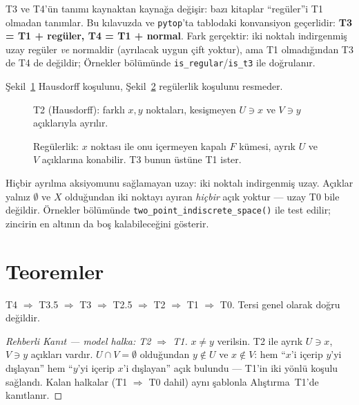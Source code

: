 \begin{dikkat}
T3 ve T4'ün tanımı kaynaktan kaynağa değişir: bazı kitaplar
``regüler''i T1 olmadan tanımlar. Bu kılavuzda ve \texttt{pytop}'ta
tablodaki konvansiyon geçerlidir: \textbf{T3 = T1 + regüler,
T4 = T1 + normal}. Fark gerçektir: iki noktalı indirgenmiş uzay
regüler \emph{ve} normaldir (ayrılacak uygun çift yoktur), ama T1
olmadığından T3 de T4 de değildir; Örnekler bölümünde
\texttt{is\_regular}/\texttt{is\_t3} ile doğrulanır.
\end{dikkat}

Şekil~\ref{fig:ch06:t2} Hausdorff koşulunu, Şekil~\ref{fig:ch06:t3}
regülerlik koşulunu resmeder.

\begin{figure}[ht]
  \centering
  
  \caption{T2 (Hausdorff): farklı $x,y$ noktaları, kesişmeyen $U\ni x$
    ve $V\ni y$ açıklarıyla ayrılır.}
  \label{fig:ch06:t2}
\end{figure}

\begin{figure}[ht]
  \centering
  
  \caption{Regülerlik: $x$ noktası ile onu içermeyen kapalı $F$ kümesi,
    ayrık $U$ ve $V$ açıklarına konabilir. T3 bunun üstüne T1 ister.}
  \label{fig:ch06:t3}
\end{figure}

\begin{karsiornek}
Hiçbir ayrılma aksiyomunu sağlamayan uzay: iki noktalı indirgenmiş
uzay. Açıklar yalnız $\emptyset$ ve $X$ olduğundan iki noktayı ayıran
\emph{hiçbir} açık yoktur --- uzay T0 bile değildir. Örnekler
bölümünde \texttt{two\_point\_indiscrete\_space()} ile test edilir;
zincirin en altının da boş kalabileceğini gösterir.
\end{karsiornek}

\section{Teoremler}

\begin{theorem}
T4 $\Rightarrow$ T3.5 $\Rightarrow$ T3 $\Rightarrow$ T2.5 $\Rightarrow$ T2 $\Rightarrow$ T1
$\Rightarrow$ T0. Tersi genel olarak doğru değildir.
\end{theorem}

\begin{proof}[Rehberli Kanıt --- model halka: T2 $\Rightarrow$ T1]
$x\neq y$ verilsin. T2 ile ayrık $U\ni x$, $V\ni y$ açıkları vardır.
$U\cap V=\emptyset$ olduğundan $y\notin U$ ve $x\notin V$: hem
``$x$'i içerip $y$'yi dışlayan'' hem ``$y$'yi içerip $x$'i dışlayan''
açık bulundu --- T1'in iki yönlü koşulu sağlandı. Kalan halkalar
(T1 $\Rightarrow$ T0 dahil) aynı şablonla Alıştırma~T1'de
kanıtlanır.
\end{proof}

